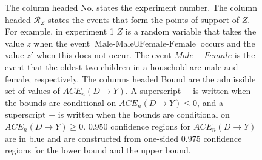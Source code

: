 \documentclass[10pt,a4paper,twoside]{article}
\numberwithin{equation}{section}
\begin{document}
\begin{sidewaystable}[p]
\begin{subfigure}{\textwidth}
\caption{The column headed No. states the experiment number. The column headed $\mathcal{R}_Z$ states the events that form the points of support of $Z$. For example, in experiment 1 $Z$ is a random variable that takes the value $z$ when the event $\text{Male-Male}\cup\text{Female-Female}$ occurs and the value $z'$ when this does not occur. The event $Male-Female$ is the event that the oldest two children in a household are male and female, respectively. The columns headed Bound are the admissible set of values of $ACE_n(D\rightarrow Y)$. A superscript $-$ is written when the bounds are conditional on $ACE_n(D\rightarrow Y)\leq 0$, and a superscript $+$ is written when the bounds are conditional on $ACE_n(D\rightarrow Y)\geq 0$. $0.950$ confidence regions for $ACE_n(D\rightarrow Y)$ are in blue and are constructed from one-sided $0.975$ confidence regions for the lower bound and the upper bound.}
\end{subfigure}
\label{tbl:acesame}
\end{sidewaystable}
\end{document}
